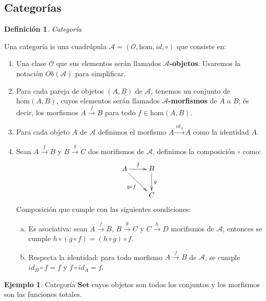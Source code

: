 \documentclass[11pt,a4paper,openright,oneside]{article}
\numberwithin{equation}{section}
\newtheorem{defi}[teo]{Definici\'on}
\theoremstyle{definition}
\newtheorem{ex}[teo]{Ejemplo}
\begin{document}
\subsection{Categor\'ias}
\begin{defi}
    Categor\'ia
\end{defi}
Una categor\'ia is una cuadr\'upula $\mathcal{A} = (\mathcal{O}, \text{hom}, \mathit{id}, \circ)$ que consiste en:
\begin{enumerate}[(1)]
    \item Una clase $\mathcal{O}$ que sus elementos ser\'an llamados $\mathcal{A}$\textbf{-objetos}. Usaremos la notaci\'on $\mathit{Ob}(\mathcal{A})$ para simplificar.
    \item Para cada pareja de objetos $(A, B)$ de $\mathcal{A}$, tenemos un conjunto de $\text{hom}(A,B)$, cuyos elementos ser\'an llamados $\mathcal{A}$\textbf{-morfismos} de $A$ a $B$; \'es decir, los morfismos $A \overset{f}{\longrightarrow} B$ para todo $f \in \text{hom}(A,B)$.
    \item Para cada objeto $A$ de $\mathcal{A}$ definimos el morfismo $A \overset{\mathit{id}_{A}}{\longrightarrow} A$ como la identidad $A$.
    \item Sean $A \overset{f}{\longrightarrow} B$ y $B \overset{g}{\longrightarrow} C$ dos morifismos de $\mathcal{A}$, definimos la composici\'on $\circ$ como:
          $$
              \xymatrix{
                  A \ar[rd]_{g\circ f} \ar[r]^f
                  &B \ar[d]^g\\
                  &C
              }
          $$
          Composici\'on que cumple con las siguientes condiciones:
          \begin{enumerate}[(a)]
              \item Es asociativa: sean $A \overset{f}{\longrightarrow} B$, $B \overset{g}{\longrightarrow} C$ y $C \overset{h}{\longrightarrow} D$ morifismos de $\mathcal{A}$, entonces se cumple $h\circ (g\circ f) = (h\circ g)\circ f$.
              \item Respecta la identidad: para todo morfismo $A \overset{f}{\longrightarrow} B$ de $\mathcal{A}$, se cumple $\mathit{id}_B\circ f = f$ y $f\circ \mathit{id}_A = f$.
          \end{enumerate}
\end{enumerate}
\begin{ex}
    Categor\'ia $\mathbf{Set}$ cuyos objetos son todos los conjuntos y los morfismos son las funciones totales.
\end{ex}
\end{document}
